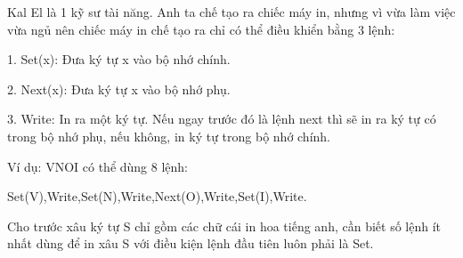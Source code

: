Kal El là 1 kỹ sư tài năng. Anh ta chế tạo ra chiếc máy in, nhưng vì vừa làm việc vừa ngủ nên chiếc máy in chế tạo ra chỉ có thể điều khiển bằng 3 lệnh:   

    1. Set(x): Đưa ký tự x vào bộ nhớ chính.   

    2. Next(x): Đưa ký tự x vào bộ nhớ phụ.   

    3. Write: In ra một ký tự. Nếu ngay trước đó là lệnh next thì sẽ in ra ký tự có trong bộ nhớ phụ, nếu không, in ký tự trong bộ nhớ chính.   

    Ví dụ: VNOI có thể dùng 8 lệnh:   

    Set(V),Write,Set(N),Write,Next(O),Write,Set(I),Write.   

    Cho trước xâu ký tự S chỉ gồm các chữ cái in hoa tiếng anh, cần biết số lệnh ít nhất dùng để in xâu S với điều kiện lệnh đầu tiên luôn phải là Set.   

\